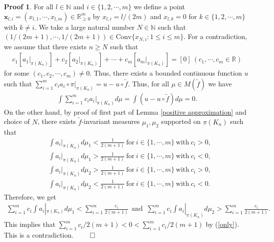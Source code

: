 \documentclass{article}
\theoremstyle{definition}
\newtheorem*{pf}{Proof}
\begin{document}
\begin{pf}
For all $l\in\mathbb{N}$ and $i\in\{1,2,\cdots,m\}$ we define a point $\boldsymbol{x}_{l,i}=(x_{l,1},\cdots,x_{l,m})\in\mathbb{R}_{\geq 0}^m$ by $x_{l,i}=l/(2m)$ and $x_{l,k}=0$ for $k\in\{1,2,\cdots,m\}$ with $k\neq i$. We take a large natural number $N\in\mathbb{N}$ such that $(1/(2m+1),\cdots,1/(2m+1))\in\text{Conv}\{x_{N,i}:1\leq i\leq m\}$. For a contradiction, we assume that there exists $n\geq N$ such that
\begin{align}\nonumber
    c_1[a_1|_{\pi(K_n)}]+c_2[a_2|_{\pi(K_n)}]+\cdots+c_m[a_m|_{\pi(K_n)}]=[0]\ (c_1,\cdots,c_m\in\mathbb{R})
\end{align}
for some $(c_1,c_2,\cdots,c_m)\neq0$.
 Thus, there exists a bounded continuous function $u$ such that 
    $\sum_{i=1}^mc_ia_i\circ\pi|_{\pi(K_n)}=u-u\circ\tilde f$. Thus, for all $\mu\in M(\tilde f)$ we have
    \begin{align}\label{only}
    \int\sum_{i=1}^{m} c_ia_i|_{\pi(K_n)}d\mu=\int (u-u\circ\tilde f)d\mu =0.
    \end{align}
On the other hand, by proof of first part of Lemma \ref{positive approximation} and choice of $N$, there exists $\tilde f$-invariant measures $\mu_1,\mu_2$ supported on $\pi(K_n)$ such that 
\begin{align}
  &\int a_i|_{\pi(K_n)} d\mu_1< \frac{1}{2(m+1)}\ \text{for}\ i\in \lbrace 1,\cdots,m\rbrace\ \text{with}\ c_i>0\nonumber,\\
   &\int a_i|_{\pi(K_n)} d\mu_1>\frac{1}{2(m+1)}\ \text{for}\ i \in \lbrace 1,\cdots,m\rbrace\ \text{with}\ c_i<0\nonumber\nonumber,\\
  &\int a_i|_{\pi(K_n)} d\mu_2> \frac{1}{2(m+1)}\ \text{for}\ i \in \lbrace 1,\cdots,m\rbrace\ \text{with}\ c_i>0\nonumber,\\
  &\int a_i|_{\pi(K_n)} d\mu_2<\frac{1}{2(m+1)}\ \text{for}\ i \in \lbrace 1,\cdots,m\rbrace\ \text{with}\ c_i<0\nonumber.
\end{align}
Therefore, we get 
\begin{align*}
   \sum_{i=1}^m c_i\int a_i|_{\pi(K_n)} d\mu_1<\sum_{i=1}^m\frac{c_i}{2(m+1)}\ \ \text{and\ }\ 
   \sum_{i=1}^m c_i\int a_i|_{\pi(K_n)} d\mu_2>\sum_{i=1}^m\frac{c_i}{2(m+1)}.
\end{align*} 
This implies that $\sum_{i=1}^m{c_i}/{2(m+1)}<0<\sum_{i=1}^m{c_i}/{2(m+1)}$ by (\ref{only}). This is a contradiction.
$\qed$
\end{pf}
\end{document}
